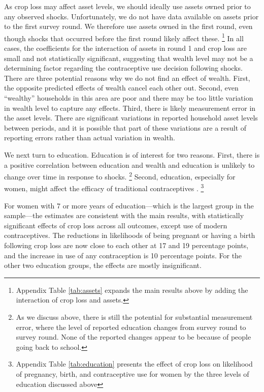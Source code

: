 \documentclass[letterpaper,12pt]{article}
\begin{document}
As crop loss may affect asset levels, we should ideally use assets owned 
prior to any observed shocks.
Unfortunately, we do not have data available on assets prior to the first 
survey round.
We therefore use assets owned in the first round, even though 
shocks that occurred before the first round likely affect these.%
\footnote{
Appendix Table \ref{tab:assets} expands the main results above by adding 
the interaction of crop loss and assets.
}
In all cases, the coefficients for the interaction of assets in round 1 and 
crop loss are small and not statistically significant,
suggesting that wealth level may not be a determining
factor regarding the contraceptive use decision following shocks. 
There are three potential reasons why we do not find an effect of wealth.
First, the opposite predicted effects of wealth cancel each other out.
Second, even ``wealthy'' households in this area are  poor and
there may be too little variation in wealth level to capture any effects.
Third, there is likely measurement error in the asset levels. 
There are significant variations in reported household asset levels between 
periods, and it is possible that part of these variations are a result of 
reporting errors rather than actual variation in wealth.

We next turn to education.
Education is of interest for two reasons.
First, there is a positive correlation between education and wealth and 
education is unlikely to change over time in response to shocks.%
\footnote{
As we discuss above, there is still the potential for substantial
measurement error, where the level of reported education changes
from survey round to survey round.
None of the reported changes appear to be because of people going 
back to school.
}
Second, education, especially for women, might affect the efficacy of 
traditional contraceptives \citep{Rosenzweig1989}.%
\footnote{
Appendix Table \ref{tab:education} presents the effect of crop loss on
likelihood of pregnancy, birth, and contraceptive use for women
by the three levels of education discussed above 
}

For women with 7 or more years of education---which is the largest
group in the sample---the estimates are consistent with the 
main results, with statistically significant effects of crop loss 
across all outcomes, except use of modern contraceptives.
The reductions in likelihoods of being pregnant or having a birth
following crop loss are now close to each other at 17 and 19 percentage
points, and the increase in use of any contraception is 10 percentage
points.
For the other two education groups, the effects are mostly insignificant.
\end{document}
